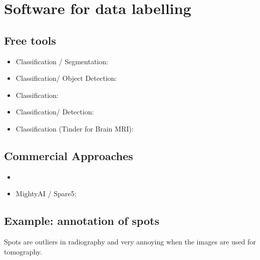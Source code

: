 \documentclass[letterpaper,10pt,english]{sphinxmanual}
\begin{document}
\section{Software for data labelling}
\label{\detokenize{03-Datasets:software-for-data-labelling}}

\subsection{Free tools}
\label{\detokenize{03-Datasets:free-tools}}\begin{itemize}
\item {} 
\sphinxAtStartPar
Classification / Segmentation: 

\item {} 
\sphinxAtStartPar
Classification/ Object Detection: 

\item {} 
\sphinxAtStartPar
Classification:  

\item {} 
\sphinxAtStartPar
Classification/ Detection:  

\item {} 
\sphinxAtStartPar
Classification (Tinder for Brain MRI): 

\end{itemize}


\subsection{Commercial Approaches}
\label{\detokenize{03-Datasets:commercial-approaches}}\begin{itemize}
\item {} 
\sphinxAtStartPar
{}

\item {} 
\sphinxAtStartPar
MightyAI / Spare5:  

\end{itemize}


\subsection{Example: annotation of spots}
\label{\detokenize{03-Datasets:example-annotation-of-spots}}
\sphinxAtStartPar
Spots are outliers in radiography and very annoying when the images are used for tomography.
\end{document}
